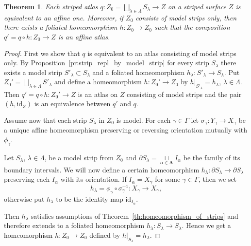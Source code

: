 \documentclass[12pt, reqno]{amsart}
\newcommand{\theoremname}{Theorem}%
\newtheorem{theorem}[subsection]{\protect\theoremname}
\newcommand\dif{h}
\newcommand{\strip}{S}
\newcommand{\stripSurf}{Z}
\newcommand{\preStripSurf}{\stripSurf_0}
\newcommand{\bdX}{X}
\newcommand{\bdY}{Y}
\newcommand{\aind}{{\alpha}}
\newcommand{\Aind}{\mathbf{A}}
\newcommand{\stInd}{{\lambda}}
\newcommand{\StInd}{\Lambda}
\newcommand{\bdGlueInd}{{\gamma}}
\newcommand{\BdGlueInd}{\Gamma}
\newcommand{\id}{\mathrm{id}}
\newcommand{\qmap}{q}
\begin{document}
\begin{theorem}\label{th:all_striped_surf_are_affine}
Each striped atlas $\qmap:\preStripSurf=\bigsqcup \limits_{\stInd \in \StInd} \strip_{\stInd}\to\stripSurf$ on a striped surface $\stripSurf$ is equivalent to an affine one.
Moreover, if $\preStripSurf$ consists of model strips only, then there exists a foliated homeomorphism $h:\preStripSurf\to\preStripSurf$ such that the composition $\qmap' = \qmap\circ\dif:\preStripSurf\to\stripSurf$ is an affine atlas.
\end{theorem}
\begin{proof}
\newcommand\aff{\sigma}
First we show that $\qmap$ is equivalent to an atlas consisting of model strips only.
By Proposition~\ref{pr:strip_repl_by_model_strip} for every strip $\strip_{\stInd}$ there exists a model strip $\strip'_{\stInd} \subset \strip_{\stInd}$ and a foliated homeomorphism $\dif_{\stInd}:\strip'_{\stInd}\to \strip_{\stInd}$.
Put $\preStripSurf' = \bigsqcup \limits_{\stInd \in \StInd} \strip'_{\stInd}$ and define a homeomorphism $\dif:\preStripSurf'\to \preStripSurf$ by $\dif|_{\strip'_{\stInd}} = \dif_{\stInd}$, $\stInd\in\StInd$.
Then $\qmap' = \qmap \circ\dif:\preStripSurf' \to \stripSurf$ is an atlas on $\stripSurf$ consisting of model strips and the pair $(\dif, \id_{\stripSurf})$ is an equivalence between $\qmap'$ and $\qmap$.


\medskip

Assume now that each strip $\strip_{\stInd}$ in $\preStripSurf$ is model.
For each $\bdGlueInd \in \BdGlueInd$ let $\aff_{\bdGlueInd}:\bdY_{\bdGlueInd} \to \bdX_{\bdGlueInd}$ be a unique affine homeomorphism preserving or reversing orientation mutually with $\phi_{\bdGlueInd}$.

Let $\strip_{\stInd}$, $\stInd \in \StInd$, be a model strip from $\preStripSurf$ and $\partial\strip_{\stInd}=\mathop{\sqcup}\limits_{\aind\in \Aind} I_{\aind}$ be the family of its boundary intervals.
We will now define a certain homeomorphism $\dif_{\stInd}: \partial\strip_{\stInd} \to \partial \strip_{\stInd}$ preserving each $I_{\aind}$ with its orientation.
If $I_{\aind} = \bdX_{\bdGlueInd}$ for some $\bdGlueInd \in \BdGlueInd$, then we set 
\[
\dif_{\stInd} = \phi_{\bdGlueInd} \circ \sigma_{\bdGlueInd}^{-1}: \bdX_{\bdGlueInd} \to \bdX_{\bdGlueInd},
\]
otherwise put $\dif_{\stInd}$ to be the identity map $\id_{I_{\aind}}$.

Then $\dif_{\stInd}$ satisfies assumptions of Theorem~\ref{th:homeomorphism_of_strips} and therefore extends to a foliated homeomorphism $\dif_{\stInd}: \strip_{\stInd} \to \strip_{\stInd}$.
Hence we get a homeomorphism $\dif:\preStripSurf \to \preStripSurf$ defined by $\dif|_{\strip_{\stInd}} = \dif_{\stInd}$.


\end{proof}
\end{document}
